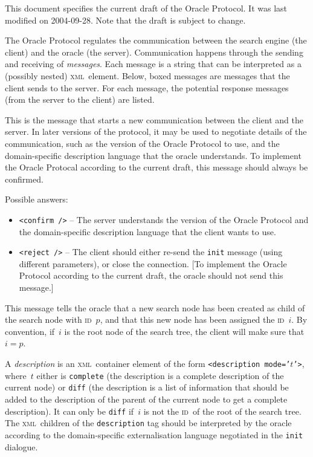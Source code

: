 \documentclass[halfparskip]{scrartcl}
\newcommand*{\ID}{%
  \textsc{id}}
\newcommand*{\MESSAGE}[1]{%
  \bigskip\par\fbox{#1}}
\newcommand*{\META}[1]{%
  $\langle$\emph{#1}$\rangle$}
\newcommand*{\XML}{%
  \textsc{xml}}
\newcommand*{\XMLTAG}[1]{%
  \texttt{<#1 />}}
\newcommand*{\XMLTAGOPEN}[1]{%
  \texttt{<#1>}}
\newcommand*{\XMLTAGCLOSE}[1]{%
  \texttt{</#1>}}
\begin{document}
This document specifies the current draft of the Oracle Protocol.  It
was last modified on 2004-09-28.  Note that the draft is subject to
change.

The Oracle Protocol regulates the communication between the search
engine (the client) and the oracle (the server).  Communication
happens through the sending and receiving of \emph{messages}.  Each
message is a string that can be interpreted as a (possibly nested)
\XML\ element.  Below, boxed messages are messages that the client
sends to the server.  For each message, the potential response
messages (from the server to the client) are listed.

\MESSAGE{\XMLTAG{init}}

This is the message that starts a new communication between the client
and the server.  In later versions of the protocol, it may be used to
negotiate details of the communication, such as the version of the
Oracle Protocol to use, and the domain-specific description language
that the oracle understands.  To implement the Oracle Protocal
according to the current draft, this message should always be
confirmed.

Possible answers:
\begin{itemize}
\item \XMLTAG{confirm} -- The server understands the version of the
  Oracle Protocol and the domain-specific description language that
  the client wants to use.
\item \XMLTAG{reject} -- The client should either re-send the
  \texttt{init} message (using different parameters), or close the
  connection.  [To implement the Oracle Protocol according to the
  current draft, the oracle should not send this message.]
\end{itemize}

\MESSAGE{\XMLTAGOPEN{new id='$i$' parentid='$p$'}\META{description}\XMLTAGCLOSE{new}}

This message tells the oracle that a new search node has been created
as child of the search node with \ID~$p$, and that this new node has
been assigned the \ID~$i$.  By convention, if~$i$ is the root node of
the search tree, the client will make sure that $i=p$.

A \emph{description} is an \XML\ container element of the form
\XMLTAGOPEN{description mode='$t$'}, where~$t$ either is
\texttt{complete} (the description is a complete description of the
current node) or \texttt{diff} (the description is a list of
information that should be added to the description of the parent of
the current node to get a complete description).  It can only be
\texttt{diff} if~$i$ is not the \ID\ of the root of the search tree.
The \XML\ children of the \texttt{description} tag should be
interpreted by the oracle according to the domain-specific
externalisation language negotiated in the \texttt{init} dialogue.
\end{document}
